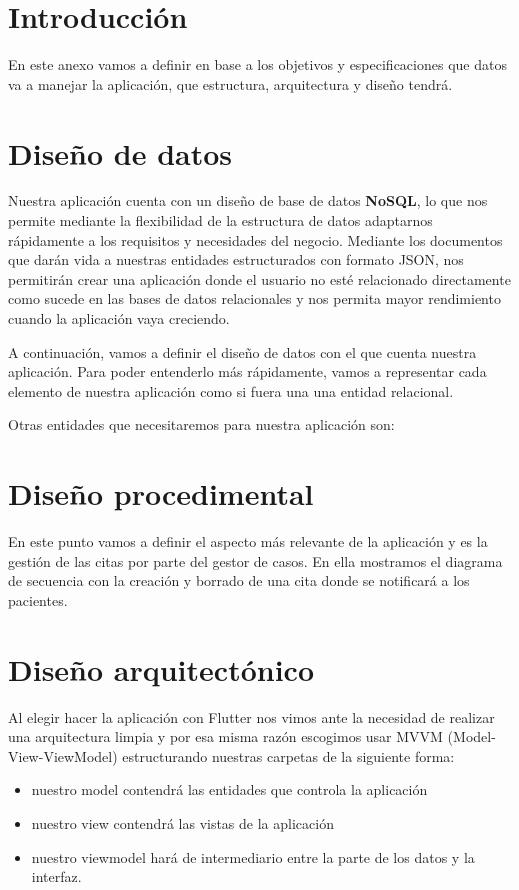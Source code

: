 
\section{Introducción}
En este anexo vamos a definir en base a los objetivos y especificaciones que datos va a manejar la aplicación, que estructura, arquitectura y diseño tendrá.

\section{Diseño de datos}
Nuestra aplicación cuenta con un diseño de base de datos \textbf{NoSQL}, lo que nos permite mediante la flexibilidad de la estructura de datos adaptarnos rápidamente a los requisitos y necesidades del negocio. Mediante los documentos que darán vida a nuestras entidades estructurados con formato JSON, nos permitirán crear una aplicación donde el usuario no esté relacionado directamente como sucede en las bases de datos relacionales y nos permita mayor rendimiento cuando la aplicación vaya creciendo.

A continuación, vamos a definir el diseño de datos con el que cuenta nuestra aplicación. Para poder entenderlo más rápidamente, vamos a representar cada elemento de nuestra aplicación como si fuera una una entidad relacional.
 
Otras entidades que necesitaremos para nuestra aplicación son:

\section{Diseño procedimental}
En este punto vamos a definir el aspecto más relevante de la aplicación y es la gestión de las citas por parte del gestor de casos. En ella mostramos el diagrama de secuencia con la creación y borrado de una cita donde se notificará a los pacientes.


\section{Diseño arquitectónico}
Al elegir hacer la aplicación con Flutter nos vimos ante la necesidad de realizar una arquitectura limpia y por esa misma razón escogimos usar MVVM (Model-View-ViewModel) estructurando nuestras carpetas de la siguiente forma:
\begin{itemize}
	\item nuestro model contendrá las entidades que controla la aplicación
	\item nuestro view contendrá las vistas de la aplicación
	\item nuestro viewmodel hará de intermediario entre la parte de los datos y la interfaz.
\end{itemize}



